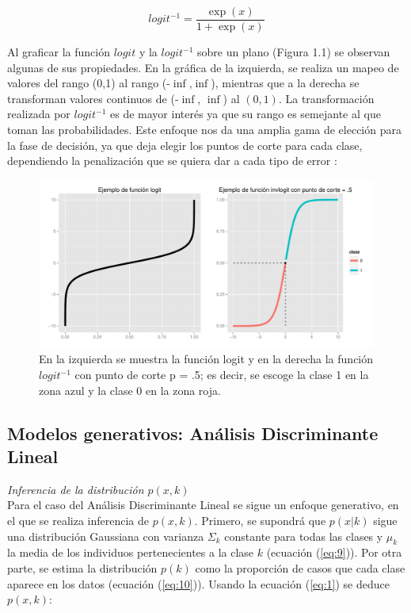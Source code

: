 \begin{equation} \label{eq:17}
 logit^{-1}  = \frac{\exp(x)}{1+\exp(x)}
 \end{equation}


Al graficar la función $logit$ y la $logit^{-1}$ sobre un plano (Figura 1.1) se observan algunas de sus propiedades. En la gráfica de la izquierda, se realiza un mapeo de valores del rango (0,1) al rango (-$\inf$,$\inf$), mientras que a la derecha se transforman valores continuos de (-$\inf$, $\inf$) al $(0,1)$. La transformación realizada por $logit^{-1}$ es de mayor interés ya que su rango es semejante al que toman las probabilidades. Este enfoque nos da una amplia gama de elección para la fase de decisión, ya que deja elegir los puntos de corte para cada clase, dependiendo la penalización que se quiera dar a cada tipo de error \cite{hastie2009elements}:

\begin{figure}[!ht]
  \centering
	\includegraphics[width=1\textwidth]{Figures/Chapter1_logit}	
  \caption[Función logit y $logit^{-1}$]
  {En la izquierda se muestra la función logit y en la derecha la función $logit^{-1}$ con punto de corte p = .5; es decir, se escoge la clase 1 en la zona azul y la clase 0 en la zona roja.}
\end{figure}

\pagebreak
\subsection{Modelos generativos: Análisis Discriminante Lineal}


\textit{Inferencia de la distribución $p(x,k)$}\\
Para el caso del Análisis Discriminante Lineal se sigue un enfoque generativo, en el que se realiza inferencia de $p(x,k)$. Primero, se supondrá que $p(x|k)$ sigue una distribución Gaussiana con varianza $\Sigma_{k}$ constante para todas las clases y $\mu_{k}$ la media de los individuos pertenecientes a la clase $k$ (ecuación (\ref{eq:9})). Por otra parte, se estima la distribución $p(k)$ como la proporción de casos que cada clase aparece en los datos (ecuación (\ref{eq:10})). Usando la ecuación (\ref{eq:1}) se deduce $p(x,k)$:


